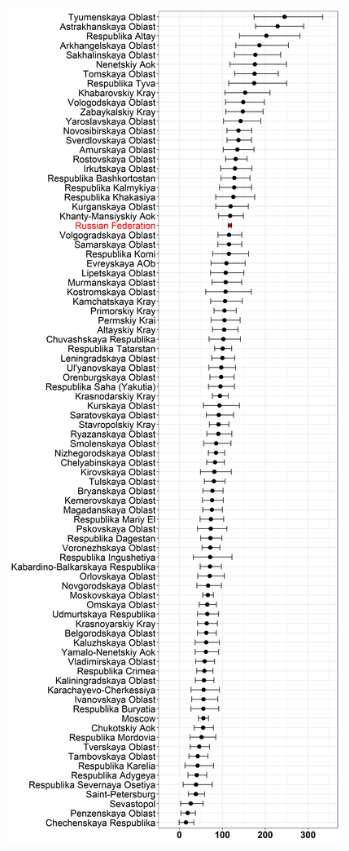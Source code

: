 \documentclass[12pt,a4paper]{article}
\numberwithin{equation}{section}
\begin{document}
\begin{figure}[h!]
	\begin{minipage}[b]{.5\linewidth}
		\centering
		\hspace*{-0.4in}
		\includegraphics[width=250pt]{reg_he_18.png}
		\label{}
	\end{minipage}
	\hfill
	\begin{minipage}[b]{.5\linewidth}
		\centering
		\hspace*{-0.2in}

\end{minipage}
\end{figure}
\end{document}

